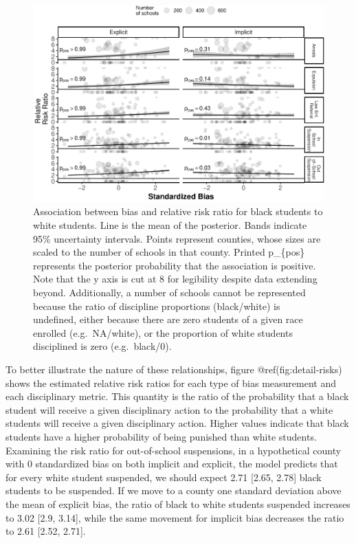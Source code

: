 \documentclass[9pt,twocolumn,twoside,lineno]{pnas-new}
\begin{document}
\begin{figure}
\centering
\includegraphics{Riddle_Sinclair_PNAS_files/figure-latex/detail-risks-1.pdf}
\caption{Association between bias and relative risk ratio for black
students to white students. Line is the mean of the posterior. Bands
indicate 95\% uncertainty intervals. Points represent counties, whose
sizes are scaled to the number of schools in that county. Printed
p\_\{pos\} represents the posterior probability that the association is
positive. Note that the y axis is cut at 8 for legibility despite data
extending beyond. Additionally, a number of schools cannot be
represented because the ratio of discipline proportions (black/white) is
undefined, either because there are zero students of a given race
enrolled (e.g.~NA/white), or the proportion of white students
disciplined is zero (e.g.~black/0).}
\end{figure}

To better illustrate the nature of these relationships, figure
@ref(fig:detail-risks) shows the estimated relative risk ratios for each
type of bias measurement and each disciplinary metric. This quantity is
the ratio of the probability that a black student will receive a given
disciplinary action to the probability that a white students will
receive a given disciplinary action. Higher values indicate that black
students have a higher probability of being punished than white
students. Examining the risk ratio for out-of-school suspensions, in a
hypothetical county with 0 standardized bias on both implicit and
explicit, the model predicts that for every white student suspended, we
should expect 2.71 {[}2.65, 2.78{]} black students to be suspended. If
we move to a county one standard deviation above the mean of explicit
bias, the ratio of black to white students suspended increases to 3.02
{[}2.9, 3.14{]}, while the same movement for implicit bias decreases the
ratio to 2.61 {[}2.52, 2.71{]}.
\end{document}
